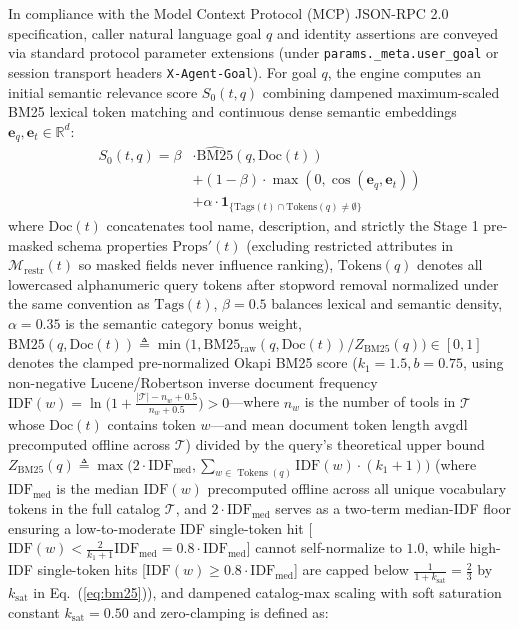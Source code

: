 \documentclass[conference,10pt]{IEEEtran}
\begin{document}
In compliance with the Model Context Protocol (MCP) JSON-RPC 2.0 specification, caller natural language goal $q$ and identity assertions are conveyed via standard protocol parameter extensions (under \texttt{params.\_meta.user\_goal} or session transport headers \texttt{X-Agent-Goal}). For goal $q$, the engine computes an initial semantic relevance score $S_0(t, q)$ combining dampened maximum-scaled BM25 lexical token matching and continuous dense semantic embeddings $\mathbf{e}_q, \mathbf{e}_t \in \mathbb{R}^d$:
\begin{equation}
\label{eq:initial_score}
\begin{aligned}
S_0(t, q) = \beta &\cdot \widehat{\mathrm{BM25}}(q, \text{Doc}(t)) \\
&+ (1 - \beta) \cdot \max(0, \cos(\mathbf{e}_q, \mathbf{e}_t)) \\
&+ \alpha \cdot \mathbf{1}_{\{\text{Tags}(t) \cap \text{Tokens}(q) \neq \emptyset\}}
\end{aligned}
\end{equation}
where $\text{Doc}(t)$ concatenates tool name, description, and strictly the Stage 1 pre-masked schema properties $\text{Props}'(t)$ (excluding restricted attributes in $\mathcal{M}_{\text{restr}}(t)$ so masked fields never influence ranking), $\text{Tokens}(q)$ denotes all lowercased alphanumeric query tokens after stopword removal normalized under the same convention as $\text{Tags}(t)$, $\beta = 0.5$ balances lexical and semantic density, $\alpha = 0.35$ is the semantic category bonus weight, $\text{BM25}(q, \text{Doc}(t)) \triangleq \min\big(1, \text{BM25}_{\text{raw}}(q, \text{Doc}(t)) / Z_{\text{BM25}}(q)\big) \in [0, 1]$ denotes the clamped pre-normalized Okapi BM25 score ($k_1 = 1.5, b = 0.75$, using non-negative Lucene/Robertson inverse document frequency $\text{IDF}(w) = \ln\!\big(1 + \frac{|\mathcal{T}| - n_w + 0.5}{n_w + 0.5}\big) > 0$—where $n_w$ is the number of tools in $\mathcal{T}$ whose $\text{Doc}(t)$ contains token $w$—and mean document token length $\text{avgdl}$ precomputed offline across $\mathcal{T}$) divided by the query's theoretical upper bound $Z_{\text{BM25}}(q) \triangleq \max\big(2 \cdot \text{IDF}_{\text{med}}, \sum_{w \in \operatorname{Tokens}(q)} \text{IDF}(w) \cdot (k_1 + 1)\big)$ (where $\text{IDF}_{\text{med}}$ is the median $\text{IDF}(w)$ precomputed offline across all unique vocabulary tokens in the full catalog $\mathcal{T}$, and $2 \cdot \text{IDF}_{\text{med}}$ serves as a two-term median-IDF floor ensuring a low-to-moderate IDF single-token hit [$\text{IDF}(w) < \frac{2}{k_1 + 1}\text{IDF}_{\text{med}} = 0.8 \cdot \text{IDF}_{\text{med}}$] cannot self-normalize to $1.0$, while high-IDF single-token hits [$\text{IDF}(w) \ge 0.8 \cdot \text{IDF}_{\text{med}}$] are capped below $\frac{1}{1 + k_{\text{sat}}} = \frac{2}{3}$ by $k_{\text{sat}}$ in Eq.~(\ref{eq:bm25})), and dampened catalog-max scaling with soft saturation constant $k_{\text{sat}} = 0.50$ and zero-clamping is defined as:
\end{document}
